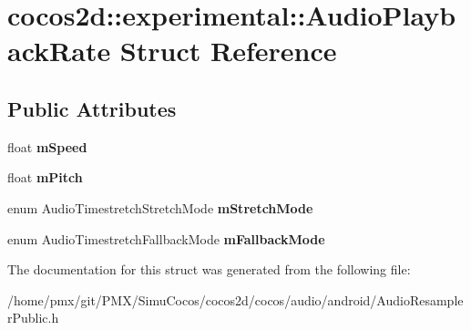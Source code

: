 \hypertarget{structcocos2d_1_1experimental_1_1AudioPlaybackRate}{}\section{cocos2d\+:\+:experimental\+:\+:Audio\+Playback\+Rate Struct Reference}
\label{structcocos2d_1_1experimental_1_1AudioPlaybackRate}
\subsection*{Public Attributes}
\begin{DoxyCompactItemize}
\item 
\mbox{\label{structcocos2d_1_1experimental_1_1AudioPlaybackRate_a77147d93e46e35e076c80f6c493c6c3c}} 
float {\bfseries m\+Speed}
\item 
\mbox{\label{structcocos2d_1_1experimental_1_1AudioPlaybackRate_a0832672dc145c4cbadc78f50c8e76883}} 
float {\bfseries m\+Pitch}
\item 
\mbox{\label{structcocos2d_1_1experimental_1_1AudioPlaybackRate_abdfa6a14e83724ca62b8a08b98e9305c}} 
enum Audio\+Timestretch\+Stretch\+Mode {\bfseries m\+Stretch\+Mode}
\item 
\mbox{\label{structcocos2d_1_1experimental_1_1AudioPlaybackRate_a4d94bb9355bb6ac5c7963b30a9986af2}} 
enum Audio\+Timestretch\+Fallback\+Mode {\bfseries m\+Fallback\+Mode}
\end{DoxyCompactItemize}


The documentation for this struct was generated from the following file\+:\begin{DoxyCompactItemize}
\item 
/home/pmx/git/\+P\+M\+X/\+Simu\+Cocos/cocos2d/cocos/audio/android/Audio\+Resampler\+Public.\+h\end{DoxyCompactItemize}
